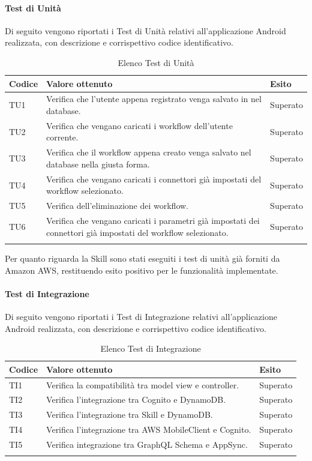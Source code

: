 \paragraph{Test di Unità}
\label{sec:tuRQ}
Di seguito vengono riportati i Test di Unità relativi all'applicazione Android realizzata, con descrizione e corrispettivo codice identificativo.
\begin{center}
	\centering
	\renewcommand{\arraystretch}{1.5}
	\begin{longtable}{  p{1.5cm}  p{10.5cm} p{2cm}  }
		\rowcolor{tableHeadYellow}
		\textbf{Codice}   & \textbf{Valore ottenuto} & \textbf{Esito} \\ 
		\endhead
		TU1 & Verifica che l’utente appena registrato venga salvato in nel database.  & Superato \\
		TU2 & Verifica che vengano caricati i workflow dell’utente corrente. & Superato \\
		TU3 & Verifica che il workflow appena creato venga salvato nel database nella giusta forma. & Superato \\
		TU4 & Verifica che vengano caricati i connettori già impostati del workflow selezionato. & Superato \\
		TU5 & Verifica dell’eliminazione dei workflow. & Superato \\
		TU6 & Verifica che vengano caricati i parametri già impostati dei connettori già impostati del workflow selezionato. & Superato \\
		\rowcolor{white}
		\caption{Elenco Test di Unità}
	\end{longtable}
\end{center}
Per quanto riguarda la Skill sono stati eseguiti i test di unità già forniti da Amazon AWS, restituendo esito positivo per le funzionalità implementate.
\paragraph{Test di Integrazione}
\label{sec:tiRQ}
Di seguito vengono riportati i Test di Integrazione relativi all'applicazione Android realizzata, con descrizione e corrispettivo codice identificativo.
\begin{center}
	\centering
	\renewcommand{\arraystretch}{1.5}
	\begin{longtable}{  p{1.5cm}  p{10.5cm} p{2cm}  }
		\rowcolor{tableHeadYellow}
		\textbf{Codice}   & \textbf{Valore ottenuto} & \textbf{Esito} \\ 
		\endhead
		TI1 & Verifica la compatibilità tra model view e controller.  & Superato \\
		TI2 & Verifica l’integrazione tra Cognito e DynamoDB. & Superato \\
		TI3 & Verifica l’integrazione tra Skill e DynamoDB. & Superato \\
		TI4 & Verifica l’integrazione tra AWS MobileClient e Cognito. & Superato \\
		TI5 & Verifica integrazione tra GraphQL Schema e AppSync. & Superato \\
		\rowcolor{white}
		\caption{Elenco Test di Integrazione}
	\end{longtable}
\end{center}
